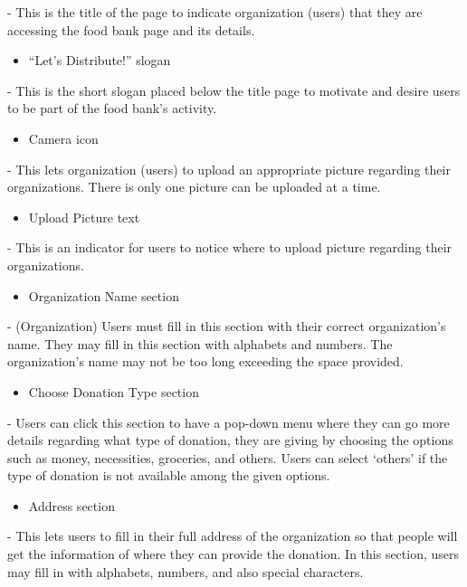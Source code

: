 \documentclass[conference]{IEEEtran}
\begin{document}
- This is the title of the page to indicate organization (users) that they are accessing the food bank page and its details.\\

\begin{itemize}
\item “Let’s Distribute!” slogan
\end{itemize}

- This is the short slogan placed below the title page to motivate and desire users to be part of the food bank’s activity. \\
\begin{itemize}
\item Camera icon
\end{itemize}
- This lets organization (users) to upload an appropriate picture regarding their organizations. There is only one picture can be uploaded at a time.\\

\begin{itemize}
\item Upload Picture text
\end{itemize}
- This is an indicator for users to notice where to upload picture regarding their organizations. \\

\begin{itemize}
\item Organization Name section
\end{itemize}
- (Organization) Users must fill in this section with their correct organization’s name. They may fill in this section with alphabets and numbers. The organization’s name may not be too long exceeding the space provided.\\

\begin{itemize}
\item Choose Donation Type section
\end{itemize}
- Users can click this section to have a pop-down menu where they can go more details regarding what type of donation, they are giving by choosing the options such as money, necessities, groceries, and others. Users can select ‘others’ if the type of donation is not available among the given options. \\

\begin{itemize}
\item Address section
\end{itemize}
- This lets users to fill in their full address of the organization so that people will get the information of where they can provide the donation. In this section, users may fill in with alphabets, numbers, and also special characters. \\
 
\end{document}
